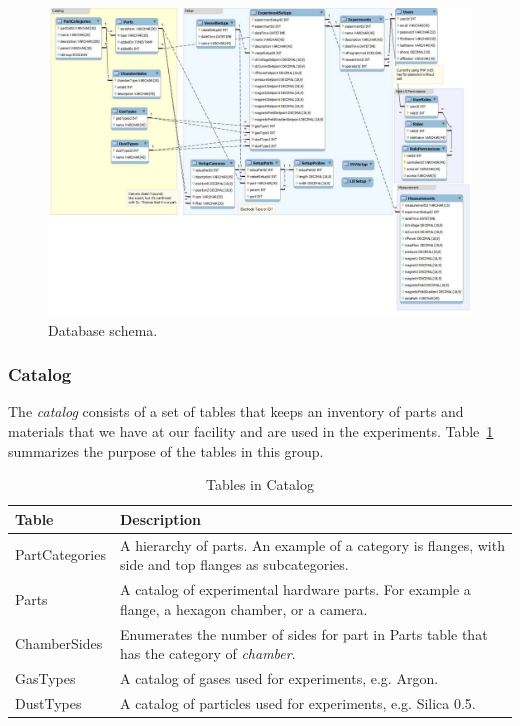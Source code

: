 \begin{figure}[h!]
\centering
\includegraphics[width=6in]{schema.pdf}
\caption{Database schema.\label{fig:schema}}
\end{figure}


\subsubsection{Catalog}

The \emph{catalog} consists of a set of tables that keeps an inventory of parts and materials that we have at our facility and are used in the experiments. Table~\ref{tb_tables_in_catalog} summarizes the purpose of the tables in this group.

\begin{table}[h]
\centering
\caption{Tables in Catalog}\label{tb_tables_in_catalog}
\begin{tabular}{l p{12cm}} \hline
{\bf Table}         & {\bf Description}\\ \hline
PartCategories  & A hierarchy of parts. An example of a category is flanges, with side and top flanges as subcategories.\\ \hline
Parts           & A catalog of experimental hardware parts. For example a flange, a hexagon chamber, or a camera.\\ \hline
ChamberSides    & Enumerates the number of sides for part in Parts table that has the category of \emph{chamber}. \\ \hline
GasTypes        & A catalog of gases used for experiments, e.g. Argon. \\ \hline
DustTypes       & A catalog of particles used for experiments, e.g. Silica 0.5.\\ \hline
\end{tabular}
\end{table}


